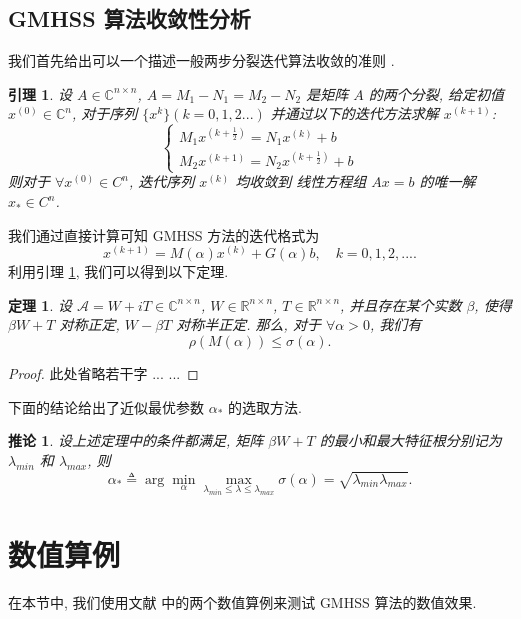 \documentclass[UTF8]{ctexart}
\theoremstyle{plain}
\newtheorem{theorem}{定理}[section]
\newtheorem{lemma}{引理}[section]
\newtheorem{corollary}{推论}[section]
\theoremstyle{nonumberplain}
\newtheorem{proof}{证明}
\numberwithin{equation}{section} %
\renewcommand{\C}{\ensuremath{\mathbb{C}}}
\newcommand{\R}{\ensuremath{\mathbb{R}}}
\newcommand{\A}{\mathcal{A}}
\newcommand{\lam}{\lambda}
\begin{document}
\subsection{GMHSS 算法收敛性分析}
我们首先给出可以一个描述一般两步分裂迭代算法收敛的准则 \cite{BGN-03}.
\begin{lemma} \label{lemma1}
  设 $A \in \C^{n \times n}$, $A=M_{1}-N_{1}=M_{2}-N_{2}$ 是矩阵 $A$ 的两个分裂,
  给定初值 $ x^{(0)} \in \C^{n} $, 对于序列 $\{x^{k}\}(k = 0,1,2...)$
  并通过以下的迭代方法求解 $x^{(k+1)}$:
  $$
    \begin{cases}
      M_{1}x^{(k+\frac{1}{2})}=N_{1}x^{(k)}+b\\
      M_{2}x^{(k+1)}=N_{2}x^{(k+\frac{1}{2})}+b
    \end{cases}
  $$
  则对于 $\forall x^{(0)} \in C^{n}$, 迭代序列 ${x^{(k)}}$ 均收敛到
  线性方程组 $Ax=b$ 的唯一解 $x_{*} \in C^{n}$.
\end{lemma}

我们通过直接计算可知 GMHSS 方法的迭代格式为
\begin{equation}\label{GMHSS}
  x^{(k+1)}=M(\alpha)x^{(k)}+G(\alpha)b,\quad k=0,1,2,....
\end{equation}
利用引理 \ref{lemma1}, 我们可以得到以下定理.
\begin{theorem}\label{Th:GMHSS-convergence}
  设 $\A=W+iT \in \C^{n \times n}$, $W \in \R^{n \times n}$, $T \in \R^{n \times n}$,
  并且存在某个实数 $\beta$, 使得 $\beta W+T$ 对称正定, $W-\beta T$ 对称半正定.
  那么, 对于 $\forall \alpha > 0$, 我们有
  $$ \rho(M(\alpha)) \leq \sigma(\alpha). $$
\end{theorem}
\begin{proof}
  此处省略若干字 ... ...
\end{proof}

下面的结论给出了近似最优参数 $\alpha_*$ 的选取方法.

\begin{corollary}
  设上述定理中的条件都满足, 矩阵 $\beta W+T$
  的最小和最大特征根分别记为 $\lam_{min}$ 和 $\lam_{max}$,
  则
  $$
    \alpha_{*} \triangleq \arg\min_{\alpha}
      \max_{\lam_{min} \leq \lam \leq \lam_{max}} \sigma(\alpha)
    =\sqrt{\lam_{min}\lam_{max}}.
  $$
\end{corollary}


\section{数值算例}
在本节中, 我们使用文献 \cite{BBC-10} 中的两个数值算例来测试
GMHSS 算法的数值效果.
\end{document}
